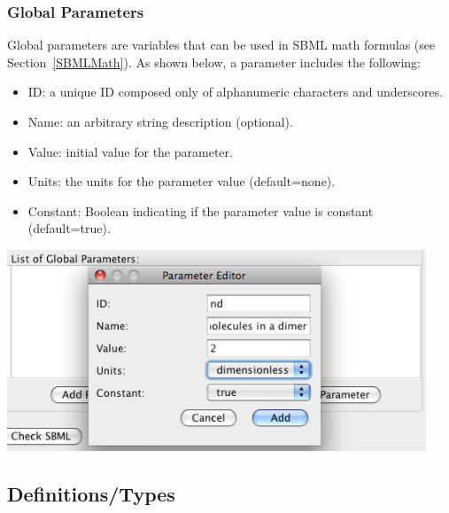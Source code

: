\documentclass[titlepage,11pt]{article}
\begin{document}
\clearpage

\subsubsection{\label{parameters}Global Parameters}

\noindent
Global parameters are variables that can 
be used in SBML math formulas (see Section~\ref{SBMLMath}).  
As shown below, a parameter includes the following:
\begin{itemize}
\item ID: a unique ID composed only of alphanumeric characters and 
       underscores.
\item Name: an arbitrary string description (optional).
\item Value: initial value for the parameter.
\item Units: the units for the parameter value (default=none).
\item Constant: Boolean indicating if the parameter value 
       is constant (default=true).
\end{itemize}
\begin{center}
\includegraphics[height=60mm]{screenshots/parameter}
\end{center}

\clearpage

\subsection{\label{DefnTypes}Definitions/Types}
\end{document}
